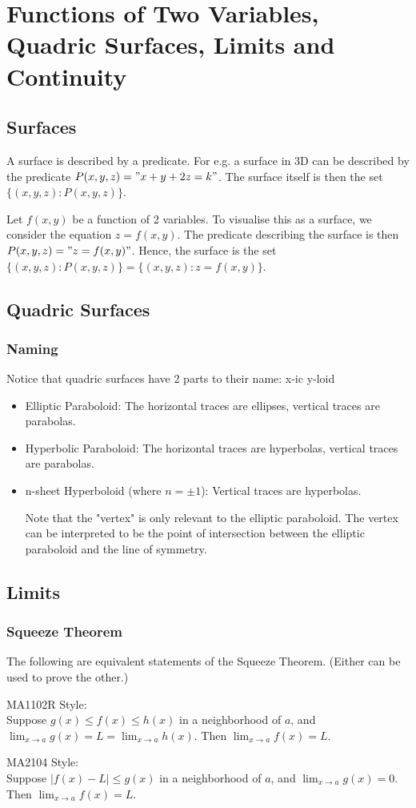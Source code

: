 \documentclass{article}
\begin{document}
\section{Functions of Two Variables, Quadric Surfaces, Limits and Continuity}
\subsection{Surfaces}
A surface is described by a predicate. For e.g. a surface in 3D can be described by the predicate $P(x,y,z)="x+y+2z=k"$. The surface itself is then the set $\{(x,y,z):P(x,y,z)\}$.

Let $f(x,y)$ be a function of 2 variables. To visualise this as a surface, we consider the equation $z=f(x,y)$. The predicate describing the surface is then $P(x,y,z)="z=f(x,y)"$. Hence, the surface is the set $\{(x,y,z):P(x,y,z)\}=\{(x,y,z):z=f(x,y)\}$.

\subsection{Quadric Surfaces}
\subsubsection{Naming}
Notice that quadric surfaces have 2 parts to their name: x-ic y-loid\\
\begin{itemize}
	\item Elliptic Paraboloid: The horizontal traces are ellipses, vertical traces are parabolas.
	\item Hyperbolic Paraboloid: The horizontal traces are hyperbolas, vertical traces are parabolas. 
	\item n-sheet Hyperboloid (where $n=\pm 1$): Vertical traces are hyperbolas.
	
Note that the "vertex" is only relevant to the elliptic paraboloid. The vertex can be interpreted to be the point of intersection between the elliptic paraboloid and the line of symmetry.
\end{itemize}

\subsection{Limits}
\subsubsection{Squeeze Theorem}
The following are equivalent statements of the Squeeze Theorem. (Either can be used to prove the other.)

MA1102R Style:\\
Suppose $g(x)\leq f(x)\leq h(x)$ in a neighborhood of $a$, and $\lim_{x\rightarrow a}g(x)=L=\lim_{x\rightarrow a}h(x)$. Then $\lim_{x\rightarrow a}f(x)=L$.

MA2104 Style:\\
Suppose $|f(x)-L|\leq g(x)$ in a neighborhood of $a$, and $\lim_{x\rightarrow a}g(x)=0$. Then $\lim_{x\rightarrow a}f(x)=L$.
\end{document}

